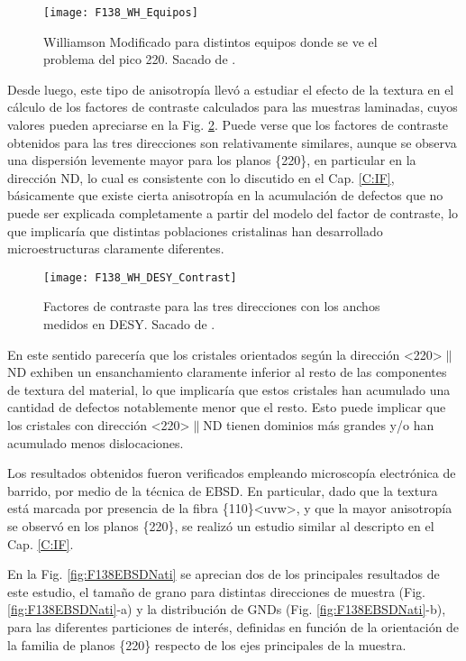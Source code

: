 \begin{figure}[!htb]
  \centering
  \texttt{[image: F138\_WH\_Equipos]}
  \caption{Williamson Modificado para distintos equipos donde se ve el problema del pico 220. Sacado de \cite{Devincentis2017}.}
  \label{fig:F138NatiWHvsEquipos}
\end{figure}

Desde luego, este tipo de anisotropía llevó a estudiar el efecto de la textura en el cálculo de los factores de contraste calculados para las muestras laminadas, cuyos valores pueden apreciarse en la Fig. \ref{fig:F138NatiContrast}.
Puede verse que los factores de contraste obtenidos para las tres direcciones son relativamente similares, aunque se observa una dispersión levemente mayor para los planos \{220\}, en particular en la dirección ND, lo cual es consistente con lo discutido en el Cap. \ref{C:IF}, básicamente que existe cierta anisotropía en la acumulación de defectos que no puede ser explicada completamente a partir del modelo del factor de contraste, lo que implicaría que distintas poblaciones cristalinas han desarrollado microestructuras claramente diferentes.

\begin{figure}[!htb]
  \centering
  \texttt{[image: F138\_WH\_DESY\_Contrast]}
  \caption{Factores de contraste para las tres direcciones con los anchos medidos en DESY. Sacado de \cite{Devincentis2017}.}
  \label{fig:F138NatiContrast}
\end{figure}

En este sentido parecería que los cristales orientados según la dirección \textless220\textgreater$\parallel$ND exhiben un ensanchamiento claramente inferior al resto de las componentes de textura del material, lo que implicaría que estos cristales han acumulado una cantidad de defectos notablemente menor que el resto.
Esto puede implicar que los cristales con dirección \textless220\textgreater$\parallel$ND tienen dominios más grandes y/o han acumulado menos dislocaciones.

Los resultados obtenidos fueron verificados empleando microscopía electrónica de barrido, por medio de la técnica de EBSD.
En particular, dado que la textura está marcada por presencia de la fibra \{110\}\textless uvw\textgreater, y que la mayor anisotropía se observó en los planos \{220\}, se realizó un estudio similar al descripto en el Cap. \ref{C:IF}.

En la Fig. \ref{fig:F138EBSDNati} se aprecian dos de los principales resultados de este estudio, el tamaño de grano para distintas direcciones de muestra (Fig. \ref{fig:F138EBSDNati}-a) y la distribución de GNDs (Fig. \ref{fig:F138EBSDNati}-b), para las diferentes particiones de interés, definidas en función de la orientación de la familia de planos \{220\} respecto de los ejes principales de la muestra.


